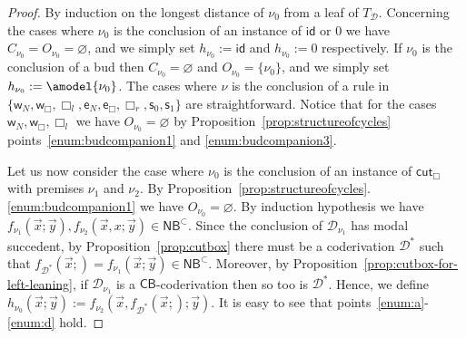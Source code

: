 \documentclass[manuscript,screen]{acmart}
\newcommand{\dfn}{:=}
\renewcommand{\emptyset}{\varnothing}
\theoremstyle{definition}
\theoremstyle{remark}
\newcommand{\permpref}{\subset}
\newcommand{\n}{N}
\newcommand{\sq}{\Box}
\renewcommand{\succ}[1]{\mathsf{s}_{#1}}
\newcommand{\model}[1]{\denot{#1}}
\newcommand{\denot}[1]{f_{#1}}
\newcommand{\bc}{\mathsf{B}}
\newcommand{\bcwfpo}[1]{\bc^{#1}}
\newcommand{\nested}{\mathsf{N}}
\newcommand{\nbcwfpo}[1]{\nested\bcwfpo{#1}}
\newcommand{\nbcpp}{\nbcwfpo{\permpref}}
\newcommand{\der}{\mathcal{D}}
\newcommand{\pder}[1]{\der_{#1}}
\newcommand{\close}[1]{{C}_{#1}}
\newcommand{\open}[1]{{O}_{#1}}
\newcommand{\hnu}{\nu_0}
\newcommand{\id}{\mathsf{id}}
\newcommand{\wk}{\mathsf{w}}
\newcommand{\exch}{\mathsf{e}}
\newcommand{\cut}{\mathsf{cut}}
\newcommand{\boxlef}{\sq_l}
\newcommand{\boxrig}{\sq_r}
\newcommand{\sql}{\boxlef}
\newcommand{\sqr}{\boxrig}
\newcommand{\zero}{0}
\newcommand{\cyclic}{\mathsf{C}}
\newcommand{\cbc}{\cyclic\bc}
\begin{document}
\begin{proof}
By induction on the longest distance of $\nu_0$ from a leaf of  $T_\der$. Concerning the cases where   $\nu_0$ is the conclusion of an instance of $\id$ or $\zero$ we have $\close{\hnu}= \open{\hnu}= \emptyset$, and we simply set $h_{\hnu}\dfn \id$ and $h_{\hnu}\dfn 0$ respectively. If $\hnu$ is the conclusion of a bud then $\close{\hnu}= \emptyset$ and $\open {\hnu}= \{\hnu\}$, and we simply set $h_{\hnu}\dfn \amodel{\hnu}$. The cases where   $\nu$ is the conclusion of a rule in $\{\wk_{\n},\wk_{\sq}, \sql , \exch_\n, \exch_\sq, \sqr,  \succ 0, \succ 1\}$ are straightforward. Notice that for the cases $\wk_{\n}, \wk_{\sq},\sql $ we have $\open{\hnu}=\emptyset$ by Proposition~\ref{prop:structureofcycles} points~\ref{enum:budcompanion1} and \ref{enum:budcompanion3}.

Let us now consider the case where $\hnu$ is the conclusion of an instance of   $\cut_{\sq}$ with premises $\nu_1$ and $\nu_2$. By Proposition~\ref{prop:structureofcycles}.\ref{enum:budcompanion1} we have $\open \hnu= \emptyset$. By induction hypothesis we have  $\model{ {\nu_1}}(\vec x; \vec y), \model{{\nu_2}}(\vec x, x; \vec y)\in \nbcpp$. Since the conclusion of $\pder{\nu_1}$  has modal succedent, by Proposition~\ref{prop:cutbox}  there must be a coderivation $\der^*$ such that $\model{\der^*}(\vec x;)= \model{{\nu_1}}(\vec x; \vec y)\in \nbcpp$. Moreover, by Proposition~\ref{prop:cutbox-for-left-leaning},  if $\pder{\nu_1}$ is a $\cbc$-coderivation then so too is $\der^*$.  Hence, we define $h_{ \hnu}(\vec x; \vec y)\dfn \model{{\nu_2}}(\vec x, \model{\der^*}(\vec x;); \vec y)$. It is easy to see that points~\ref{enum:a}-\ref{enum:d} hold.


\end{proof}
\end{document}
